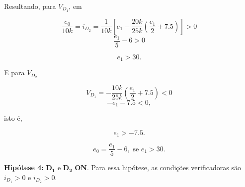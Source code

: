 \documentclass{article}
\numberwithin{equation}{section}
\let\l\left
\let\r\right
\let\dfr\dfrac
\newcommand{\itembull}[1]{\noindent\textbf{\small{\textbullet \hspace{1.5mm}#1}}}
\begin{document}
\noindent Resultando, para $V_{D_1}$, em

\begin{equation*}
    \dfr{e_0}{10k} = i_{D_2} = \dfr{1}{10k}\l[e_1-\dfr{20k}{25k}\l(\dfr{e_1}{2}+7.5\r)\r]>0
\end{equation*}
\begin{equation*}
    \dfr{e_1}{5}-6>0
\end{equation*}

\begin{equation}
    e_1>30.
\end{equation}

\noindent E para $V_{D_2}$

\begin{equation*}
    V_{D_1} = -\dfr{10k}{25k}\l(\dfr{e_1}{2}+7.5\r)<0
\end{equation*}
\begin{equation*}
    -e_1-7.5<0,
\end{equation*}

\noindent isto é,

\begin{equation}
    e_1>-7.5.
\end{equation}

\begin{equation}
\label{eq:h3}
    e_0 = \dfr{e_1}{5}-6, \text{ se }  e_1>30.
\end{equation}

\itembull{Hipótese 4:} $\mathbf{D_1}$ e $\mathbf{D_2}$ \textbf{ON}. Para essa hipótese, as condições verificadoras são $i_{D_1}>0$ e $i_{D_2}>0$.
\end{document}

